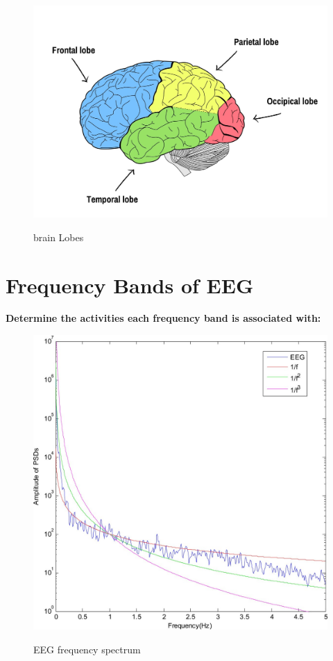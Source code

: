 \documentclass[11pt]{article}
\begin{document}
\begin{figure}[H]
    \begin{center}
        \includegraphics[scale=0.3]{Fig/brainLobes.jpg}
        \label{fig:brainLobes}
        \caption{brain Lobes}
    \end{center}
\end{figure}



\section{Frequency Bands of EEG}
\textbf{Determine the activities each frequency band is associated with:} \\

\begin{figure}[H]
    \begin{center}
        \includegraphics[scale=0.3]{Fig/brainSpectralPlot.jpg}
        \label{fig:frequencySpectrum}
        \caption{EEG frequency spectrum}
    \end{center}
\end{figure}
\end{document}
